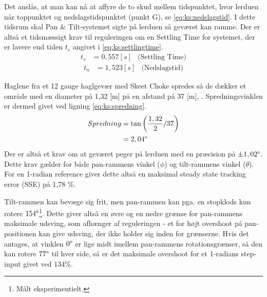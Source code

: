 Det anslås, at man kan nå at affyre de to skud mellem tidspunktet,
hvor lerduen når toppunktet og nedslagstidspunktet (punkt G), se \ref{eq:ks:nedslagstid}.
I dette tidsrum skal Pan \& Tilt-systemet sigte på lerduen så geværet kan ramme.
Der er altså et tidsmæssigt krav til reguleringen om en Settling Time for systemet,
der er lavere end tiden \(t_{s}\) angivet i \ref{eq:ks:settlingtime}.
\begin{align}
  t_{s} &= 0,557 [s] &\text{(Settling Time)}
  \label{eq:ks:settlingtime}
\end{align}
\begin{align}
  t_{n} &= 1,523 [s] &\text{(Nedslagstid)}
  \label{eq:ks:nedslagstid}
\end{align}

Haglene fra et 12 gauge haglgevær med Skeet Choke spredes så de dækker et område
med en diameter på 1,32 [m] på en afstand på 37 [m], . %
Spredningsvinklen er dermed givet ved ligning \ref{eq:ks:spredning}.
\begin{align}
  Spredning &= \tan \left(\frac{1,32}{2} / 37 \right) \\
  &= 2,04 \degree
  \label{eq:ks:spredning}
\end{align}
Der er altså et krav om at geværet peger på lerduen med en præcision på \(\pm 1,02 \degree\).
Dette krav gælder for både pan-rammens vinkel (\(\phi\)) og tilt-rammens vinkel (\(\theta\)).
For en 1-radian reference giver dette altså en maksimal steady state tracking error (SSE) på 1,78 \%.

Tilt-rammen kan bevæge sig frit,
men pan-rammen kan pga. en stopklods kun rotere \(154 \degree\)\footnote{Målt eksperimentielt.}.
Dette giver altså en øvre og en nedre grænse for pan-rammens maksimale udsving,
som afhænger af reguleringen
- et for højt overshoot på pan-positionen kan give udsving, der ikke holder sig inden for grænserne.
Hvis det antages, at vinklen \(0 \degree\) er lige midt imellem pan-rammens rotationsgrænser,
så den kan rotere \(77 \degree\) til hver side, så er det maksimale overshoot for et 1-radians step-input
givet ved \(134 \%\).
